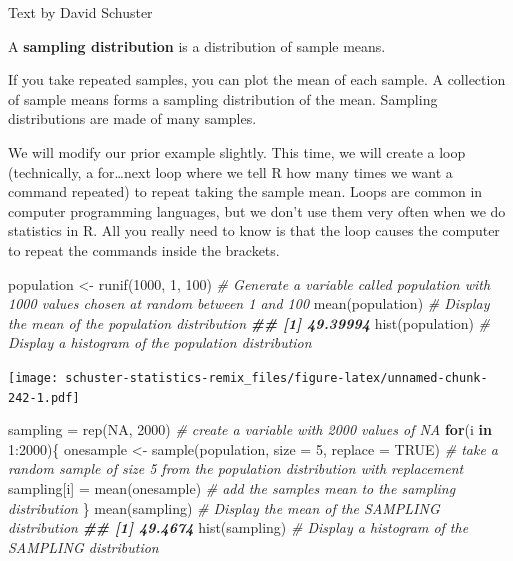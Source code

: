 \documentclass[
]{book}
\newenvironment{Shaded}{\begin{snugshade}}{\end{snugshade}}
\newcommand{\AttributeTok}[1]{\textcolor[rgb]{0.77,0.63,0.00}{#1}}
\newcommand{\CommentTok}[1]{\textcolor[rgb]{0.56,0.35,0.01}{\textit{#1}}}
\newcommand{\ConstantTok}[1]{\textcolor[rgb]{0.00,0.00,0.00}{#1}}
\newcommand{\ControlFlowTok}[1]{\textcolor[rgb]{0.13,0.29,0.53}{\textbf{#1}}}
\newcommand{\DecValTok}[1]{\textcolor[rgb]{0.00,0.00,0.81}{#1}}
\newcommand{\DocumentationTok}[1]{\textcolor[rgb]{0.56,0.35,0.01}{\textbf{\textit{#1}}}}
\newcommand{\FunctionTok}[1]{\textcolor[rgb]{0.00,0.00,0.00}{#1}}
\newcommand{\NormalTok}[1]{#1}
\newcommand{\OtherTok}[1]{\textcolor[rgb]{0.56,0.35,0.01}{#1}}
\newcommand{\SpecialCharTok}[1]{\textcolor[rgb]{0.00,0.00,0.00}{#1}}
\begin{document}
Text by David Schuster

A \textbf{sampling distribution} is a distribution of sample means.

If you take repeated samples, you can plot the mean of each sample. A collection of sample means forms a sampling distribution of the mean. Sampling distributions are made of many samples.

We will modify our prior example slightly. This time, we will create a loop (technically, a for\ldots next loop where we tell R how many times we want a command repeated) to repeat taking the sample mean. Loops are common in computer programming languages, but we don't use them very often when we do statistics in R. All you really need to know is that the loop causes the computer to repeat the commands inside the brackets.

\begin{Shaded}
\begin{Highlighting}[]
\NormalTok{population }\OtherTok{\textless{}{-}} \FunctionTok{runif}\NormalTok{(}\DecValTok{1000}\NormalTok{, }\DecValTok{1}\NormalTok{, }\DecValTok{100}\NormalTok{) }\CommentTok{\# Generate a variable called \textquotesingle{}population\textquotesingle{} with 1000 values chosen at random between 1 and 100}
\FunctionTok{mean}\NormalTok{(population) }\CommentTok{\# Display the mean of the population distribution}
\DocumentationTok{\#\# [1] 49.39994}
\FunctionTok{hist}\NormalTok{(population) }\CommentTok{\# Display a histogram of the population distribution}
\end{Highlighting}
\end{Shaded}

\texttt{[image: schuster-statistics-remix\_files/figure-latex/unnamed-chunk-242-1.pdf]}

\begin{Shaded}
\begin{Highlighting}[]
\NormalTok{sampling }\OtherTok{=} \FunctionTok{rep}\NormalTok{(}\ConstantTok{NA}\NormalTok{, }\DecValTok{2000}\NormalTok{) }\CommentTok{\# create a variable with 2000 values of NA}
\ControlFlowTok{for}\NormalTok{(i }\ControlFlowTok{in} \DecValTok{1}\SpecialCharTok{:}\DecValTok{2000}\NormalTok{)\{}
\NormalTok{  onesample }\OtherTok{\textless{}{-}} \FunctionTok{sample}\NormalTok{(population, }\AttributeTok{size =} \DecValTok{5}\NormalTok{, }\AttributeTok{replace =} \ConstantTok{TRUE}\NormalTok{) }\CommentTok{\# take a random sample of size 5 from the population distribution with replacement  }
\NormalTok{  sampling[i] }\OtherTok{=} \FunctionTok{mean}\NormalTok{(onesample) }\CommentTok{\# add the sample\textquotesingle{}s mean to the sampling distribution}
\NormalTok{\}}
\FunctionTok{mean}\NormalTok{(sampling) }\CommentTok{\# Display the mean of the SAMPLING distribution}
\DocumentationTok{\#\# [1] 49.4674}
\FunctionTok{hist}\NormalTok{(sampling) }\CommentTok{\# Display a histogram of the SAMPLING distribution}
\end{Highlighting}
\end{Shaded}
\end{document}
